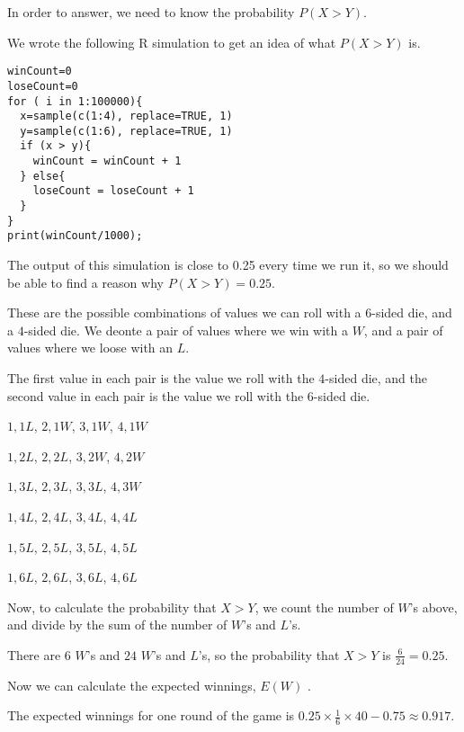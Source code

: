 \documentclass[a4paper,11pt]{article}
\begin{document}
In order to answer, we need to know the probability $P \left(X > Y \right)$.

We wrote the following R simulation to get an idea of what
$P \left(X > Y \right)$ is.

\begin{lstlisting}
winCount=0
loseCount=0
for ( i in 1:100000){
  x=sample(c(1:4), replace=TRUE, 1)
  y=sample(c(1:6), replace=TRUE, 1)
  if (x > y){
    winCount = winCount + 1
  } else{
    loseCount = loseCount + 1
  }
}
print(winCount/1000);
\end{lstlisting}

The output of this simulation is close to 0.25 every time we run it, so
we should be able to find a reason why $P \left(X > Y \right) = 0.25$.

These are the possible combinations of values we can roll with a $6$-sided
die, and a $4$-sided die. We deonte a pair of values where we win with a
$W$, and a pair of values where we loose with an $L$.

The first value in each pair is the value we roll with the $4$-sided die, and
the second value in each pair is the value we roll with the $6$-sided die.

$1, 1 L$, $2, 1 W$, $3, 1 W$, $4, 1 W$

$1 ,2 L$, $2, 2 L$, $3, 2 W$, $4, 2 W$

$1 ,3 L$, $2, 3 L$, $3, 3 L$, $4, 3 W$

$1 ,4 L$, $2, 4 L$, $3, 4 L$, $4, 4 L$

$1 ,5 L$, $2, 5 L$, $3, 5 L$, $4, 5 L$

$1 ,6 L$, $2, 6 L$, $3, 6 L$, $4, 6 L$

Now, to calculate the probability that $X > Y$, we count the number of $W$'s
above, and divide by the sum of the number of $W$'s and $L$'s.

There are $6$ $W$'s  and $24$ $W$'s and $L$'s, so the probability that
$X > Y$ is $\frac{6}{24} = 0.25$.

Now we can calculate the expected winnings,
$E\left( W \right)$ \cite{reading4b}.

The expected winnings for one round of the game is 
$ 0.25 \times \frac{1}{6} \times 40 - 0.75 \approx 0.917$.
\printbibliography{}
\end{document}
